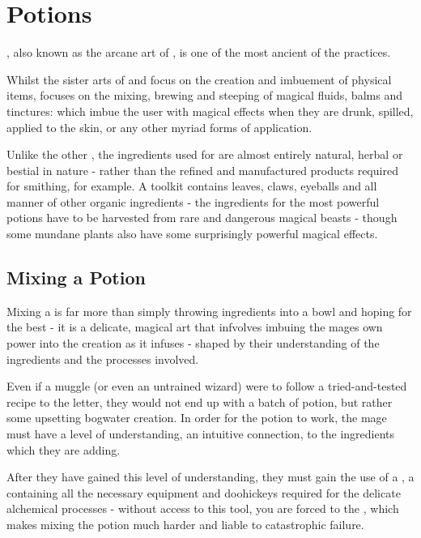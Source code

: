 \chapter{Potions}

, also known as the arcane art of , is one of the most ancient of the  practices.

Whilst the sister arts of  and  focus on the creation and imbuement of physical items,  focuses on the mixing, brewing and steeping of magical fluids, balms and tinctures:  which imbue the user with magical effects when they are drunk, spilled, applied to the skin, or any other myriad forms of application. 

Unlike the other , the ingredients used for  are almost entirely natural, herbal or bestial in nature - rather than the refined and manufactured products required for smithing, for example. A  toolkit contains leaves, claws, eyeballs and all manner of other organic ingredients - the ingredients for the most powerful potions have to be harvested from rare and dangerous magical beasts - though some mundane plants also have some surprisingly powerful magical effects. 

\section{Mixing a Potion}

Mixing a  is far more than simply throwing ingredients into a bowl and hoping for the best - it is a delicate, magical art that infvolves imbuing the mages own power into the creation as it infuses - shaped by their understanding of the ingredients and the processes involved. 

Even if a muggle (or even an untrained wizard) were to follow a tried-and-tested recipe to the letter, they would not end up with a batch of  potion, but rather some upsetting bogwater creation. In order for the potion to work, the mage must have a level of understanding, an intuitive connection, to the ingredients which they are adding. 

After they have gained this level of understanding, they must gain the use of a , a  containing all the necessary equipment and doohickeys required for the delicate alchemical processes - without access to this tool, you are forced to  the , which makes mixing the potion much harder and liable to catastrophic failure. 

